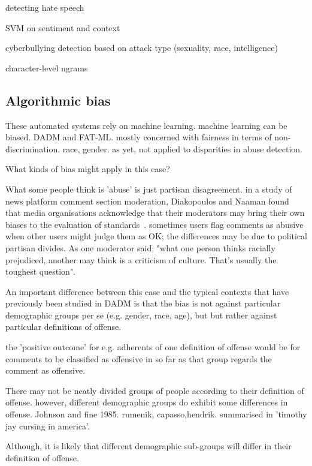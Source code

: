 \documentclass[runningheads,a4paper]{llncs}
\begin{document}
detecting hate speech ~\cite{warner2012detecting,yin2009detection,sood2012automatic}

SVM on sentiment and context

cyberbullying detection based on attack type (sexuality, race, intelligence) ~\cite{dinakar2011modeling}

character-level ngrams ~\cite{nobata2016abusive}

\subsection{Algorithmic bias}

These automated systems rely on machine learning. machine learning can be biased.
DADM and FAT-ML.
mostly concerned with fairness in terms of non-discrimination. race, gender. as yet, not applied to disparities in abuse detection.

What kinds of bias might apply in this case?

What some people think is 'abuse' is just partisan disagreement. in a study of news platform comment section moderation, Diakopoulos and Naaman found that media organisations acknowledge that their moderators may bring their own biases to the evaluation of standards~\cite{diakopoulos2011towards}. sometimes users flag comments as abusive when other users might judge them as OK; the differences may be due to political partisan divides. As one moderator said; "what one person thinks racially prejudiced, another may think is a criticism of culture. That’s usually the toughest question".

An important difference between this case and the typical contexts that have previously been studied in DADM is that the bias is not against particular demographic groups per se (e.g. gender, race, age), but but rather against particular definitions of offense. 

the 'positive outcome' for e.g. adherents of one definition of offense would be for comments to be classified as offensive in so far as that group regards the comment as offensive.

There may not be neatly divided groups of people according to their definition of offense. however, different demographic groups do exhibit some differences in offense. Johnson and fine 1985.  rumenik, capasso,hendrik. summarised in 'timothy jay cursing in america'.

Although, it is likely that different demographic sub-groups will differ in their definition of offense.
\end{document}

